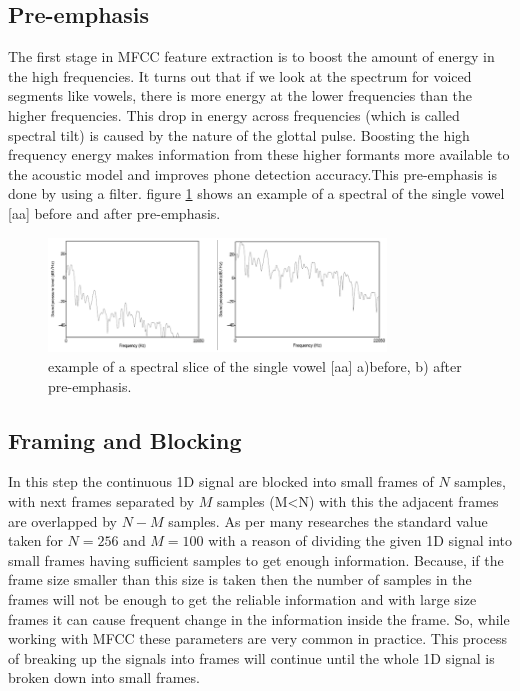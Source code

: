 \documentclass[12pt, a4paper, twoside]{report}
\begin{document}
\subsection{Pre-emphasis}
The first stage in MFCC feature extraction is to boost the amount of energy in the high frequencies. It turns out that if we look at the spectrum for voiced segments like vowels, there is more energy at the lower frequencies than the higher frequencies. This drop in energy across frequencies (which is called spectral tilt) is caused by the nature of the glottal pulse. Boosting the high frequency energy makes information from these higher formants more available to the acoustic model and improves phone detection accuracy.This pre-emphasis is done by using a filter. figure \ref{fig:pre-emphasis} shows an example of a spectral of the single vowel [aa] before and after pre-emphasis.

\begin{figure}[!h]
	\centering
	\includegraphics[width=0.8\textwidth]
	{images/chapter3/pre-emphasis}
	\caption{example of a spectral slice of the single vowel [aa]  a)before,  b) after pre-emphasis.}
	\label{fig:pre-emphasis}
\end{figure}

\subsection{Framing and Blocking}
In this step the continuous 1D signal are blocked into small frames of $N$ samples, with next frames separated by $M$ samples (M<N) with this the adjacent frames are overlapped by $N-M$ samples. As per many researches the standard value taken for $N=256$ and $M=100$ with a reason of dividing the given 1D  signal  into  small  frames  having  sufficient  samples  to  get  enough  information.  Because, if the frame size smaller than this size is taken then the number of samples in the frames will not be enough  to  get  the  reliable  information  and  with  large  size  frames  it  can  cause  frequent  change  in  the  information  inside  the  frame.  So, while   working with MFCC  these  parameters  are  very  common  in  practice. This process of breaking up the signals into frames will continue until the whole 1D signal is broken down into small frames.
\end{document}
